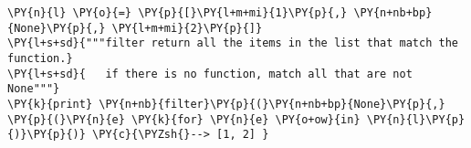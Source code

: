 \begin{Verbatim}[commandchars=\\\{\}]
\PY{n}{l} \PY{o}{=} \PY{p}{[}\PY{l+m+mi}{1}\PY{p}{,} \PY{n+nb+bp}{None}\PY{p}{,} \PY{l+m+mi}{2}\PY{p}{]}
\PY{l+s+sd}{"""filter return all the items in the list that match the function.}
\PY{l+s+sd}{   if there is no function, match all that are not None"""}
\PY{k}{print} \PY{n+nb}{filter}\PY{p}{(}\PY{n+nb+bp}{None}\PY{p}{,} \PY{p}{(}\PY{n}{e} \PY{k}{for} \PY{n}{e} \PY{o+ow}{in} \PY{n}{l}\PY{p}{)}\PY{p}{)} \PY{c}{\PYZsh{}--> [1, 2] }
\end{Verbatim}
